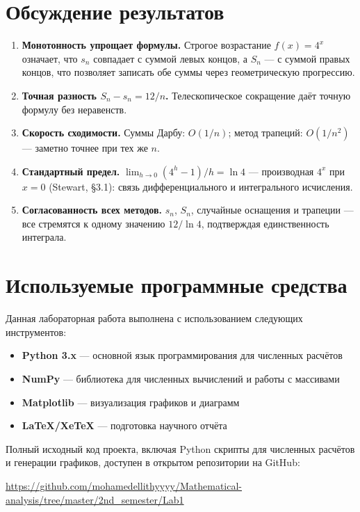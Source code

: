 \documentclass[12pt,a4paper]{article}
\begin{document}
\section{Обсуждение результатов}

\begin{enumerate}[label=\textbf{\arabic*.}]
  \item \textbf{Монотонность упрощает формулы.}
        Строгое возрастание $f(x)=4^x$ означает, что $s_n$ совпадает
        с суммой левых концов, а $S_n$ --- с суммой правых концов,
        что позволяет записать обе суммы через геометрическую прогрессию.
  \item \textbf{Точная разность $S_n-s_n=12/n$.}
        Телескопическое сокращение даёт точную формулу без неравенств.
  \item \textbf{Скорость сходимости.}
        Суммы Дарбу: $O(1/n)$; метод трапеций: $O(1/n^2)$ ---
        заметно точнее при тех же $n$.
  \item \textbf{Стандартный предел.}
        $\lim_{h\to0}(4^h-1)/h=\ln 4$ --- производная $4^x$ при $x=0$
        (Stewart, \S 3.1): связь дифференциального и интегрального исчисления.
  \item \textbf{Согласованность всех методов.}
        $s_n$, $S_n$, случайные оснащения и трапеции --- все стремятся
        к одному значению $12/\ln 4$, подтверждая единственность интеграла.
\end{enumerate}

\section{Используемые программные средства}

Данная лабораторная работа выполнена с использованием следующих инструментов:

\begin{itemize}
    \item \textbf{Python 3.x} --- основной язык программирования для численных расчётов
    \item \textbf{NumPy} --- библиотека для численных вычислений и работы с массивами
    \item \textbf{Matplotlib} --- визуализация графиков и диаграмм
    \item \textbf{LaTeX/XeTeX} --- подготовка научного отчёта
\end{itemize}

\noindent Полный исходный код проекта, включая Python скрипты для численных расчётов 
и генерации графиков, доступен в открытом репозитории на GitHub:

\begin{center}
\url{https://github.com/mohamedellithyyyy/Mathematical-analysis/tree/master/2nd_semester/Lab1}
\end{center}
\end{document}
